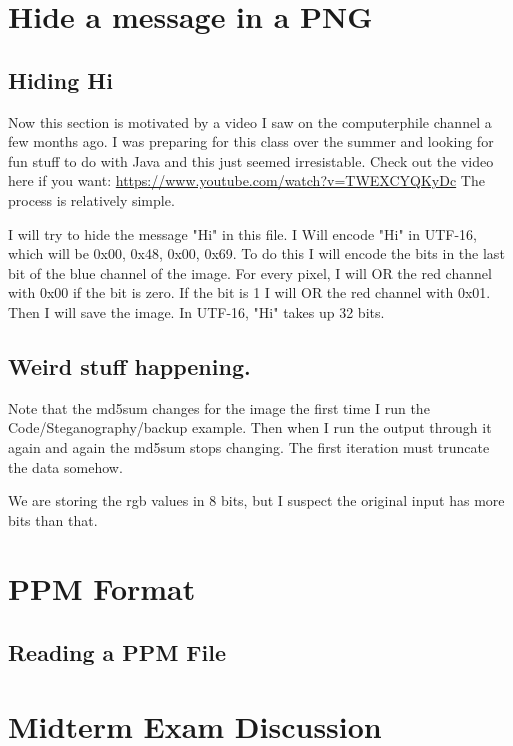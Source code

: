 \documentclass[12pt]{article}
\begin{document}
\section{Hide a message in a PNG}

\subsection{Hiding Hi}
Now this section is motivated by a video I saw on the computerphile channel a few months ago. I was preparing for this class over the summer and looking for fun stuff to do with Java and this just seemed irresistable. Check out the video here if you want: \url{https://www.youtube.com/watch?v=TWEXCYQKyDc} The process is relatively simple. 


I will try to hide the message "Hi" in this file. I Will encode "Hi" in UTF-16, which will be 0x00, 0x48, 0x00, 0x69. To do this I will encode the bits in the last bit of the blue channel of the image. For every  pixel, I will OR the red channel with 0x00 if the bit is zero. If the bit is 1 I will OR the red channel with 0x01. Then I will save the image. In UTF-16, "Hi" takes up 32 bits.






\subsection{Weird stuff happening.}
Note that the md5sum changes for the image the first time I run the Code/Steganography/backup example. Then when I run the output through it again and again the md5sum stops changing. The first iteration must truncate the data somehow.

We are storing the rgb values in 8 bits, but I suspect the original input has more bits than that.



\section{PPM Format}

\subsection{Reading a PPM File}

\section{Midterm Exam Discussion}
\end{document}
